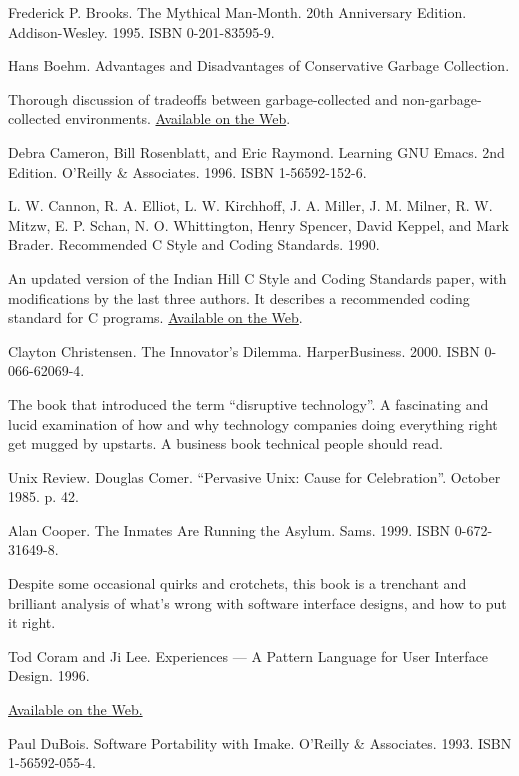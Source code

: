 \documentclass[12pt,oneside]{book}
\begin{document}
\begin{common-format}
\begin{thebibliography}{9}
 Frederick P. Brooks. The Mythical Man-Month. 20th Anniversary Edition. Addison-Wesley. 1995. ISBN 0-201-83595-9.

 Hans Boehm. Advantages and Disadvantages of Conservative Garbage Collection.

Thorough discussion of tradeoffs between garbage-collected and non-garbage-collected environments. \href{http://www.hpl.hp.com/personal/Hans_Boehm/gc/issues.html}{Available on the Web}.

 Debra Cameron, Bill Rosenblatt, and Eric Raymond. Learning GNU Emacs. 2nd Edition. O'Reilly \&{} Associates. 1996. ISBN 1-56592-152-6.

 L. W. Cannon, R. A. Elliot, L. W. Kirchhoff, J. A. Miller, J. M. Milner, R. W. Mitzw, E. P. Schan, N. O. Whittington, Henry Spencer, David Keppel, and Mark Brader. Recommended C Style and Coding Standards. 1990.

An updated version of the Indian Hill C Style and Coding Standards paper, with modifications by the last three authors. It describes a recommended coding standard for C programs. \href{http://www.apocalypse.org/pub/u/paul/docs/cstyle/cstyle.htm}{Available on the Web}.

 Clayton Christensen. The Innovator's Dilemma. HarperBusiness. 2000. ISBN 0-066-62069-4.

The book that introduced the term “disruptive technology”. A fascinating and lucid examination of how and why technology companies doing everything right get mugged by upstarts. A business book technical people should read.

 Unix Review. Douglas Comer. “Pervasive Unix: Cause for Celebration”. October 1985. p. 42.

 Alan Cooper. The Inmates Are Running the Asylum. Sams. 1999. ISBN 0-672-31649-8.

Despite some occasional quirks and crotchets, this book is a trenchant and brilliant analysis of what's wrong with software interface designs, and how to put it right.

 Tod Coram and Ji Lee. Experiences — A Pattern Language for User Interface Design. 1996.

\href{http://www.maplefish.com/todd/papers/Experiences.html}{Available on the Web.}

 Paul DuBois. Software Portability with Imake. O'Reilly \&{} Associates. 1993. ISBN 1-56592-055-4.


\end{thebibliography}
\end{common-format}
\end{document}
